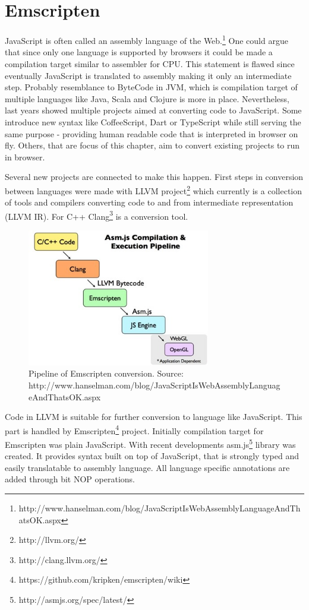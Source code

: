 \chapter{Emscripten}
\label{cha:emscripten}

JavaScript is often called an assembly language of the Web.\footnote{http://www.hanselman.com/blog/JavaScriptIsWebAssemblyLanguageAndThatsOK.aspx} One could argue that since only one language is supported by browsers it could be made a compilation target similar to assembler for CPU. This statement is flawed since eventually JavaScript is translated to assembly making it only an intermediate step. Probably resemblance to ByteCode in JVM, which is compilation target of multiple languages like Java, Scala and Clojure is more in place.
Nevertheless, last years showed multiple projects aimed at converting code to JavaScript. Some introduce new syntax like CoffeeScript, Dart or TypeScript while still serving the same purpose - providing human readable code that is interpreted in browser on fly. Others, that are focus of this chapter, aim to convert existing projects to run in browser.

Several new projects are connected to make this happen. First steps in conversion between languages were made with LLVM project\footnote{http://llvm.org/} which currently is a collection of tools and compilers converting code to and from intermediate representation (LLVM IR). For C++ Clang\footnote{http://clang.llvm.org/} is a conversion tool.

\begin{figure}[h!]
  \caption{Pipeline of Emscripten conversion. Source: http://www.hanselman.com/blog/JavaScriptIsWebAssemblyLanguageAndThatsOK.aspx}
  \label{img:emscriptenpipeline}
  \centering
	\includegraphics[width=8cm]{emscripten/pipeline.jpg}
\end{figure}

Code in LLVM is suitable for further conversion to language like JavaScript. This part is handled by Emscripten\footnote{https://github.com/kripken/emscripten/wiki} project. Initially compilation target for Emscripten was plain JavaScript. With recent developments asm.js\footnote{http://asmjs.org/spec/latest/} library was created. It provides syntax built on top of JavaScript, that is strongly typed and easily translatable to assembly language. All language specific annotations are added through bit NOP operations.

